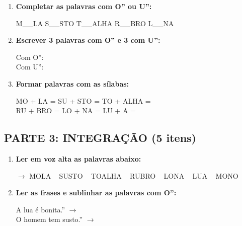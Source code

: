 \begin{exercicio}
\begin{enumerate}[resume]
  \item \textbf{Completar as palavras com O'' ou U'':}
  \begin{center}
  M\underline{~~~}LA \quad S\underline{~~~}STO \quad T\underline{~~~}ALHA \quad R\underline{~~~}BRO \quad L\underline{~~~}NA
  \end{center}

  \item \textbf{Escrever 3 palavras com O'' e 3 com U'':}
  \begin{center}
  Com O'': \underline{\hspace{2.2cm}} \underline{\hspace{2.2cm}} \underline{\hspace{2.2cm}} \\
  Com U'': \underline{\hspace{2.2cm}} \underline{\hspace{2.2cm}} \underline{\hspace{2.2cm}}
  \end{center}

  \item \textbf{Formar palavras com as sílabas:}
  \begin{center}
  MO + LA = \underline{\hspace{2cm}} \quad SU + STO = \underline{\hspace{2cm}} \quad TO + ALHA = \underline{\hspace{2cm}} \\
  RU + BRO = \underline{\hspace{2cm}} \quad LO + NA = \underline{\hspace{2cm}} \quad LU + A = \underline{\hspace{2cm}}
  \end{center}
\end{enumerate}

\subsection*{PARTE 3: INTEGRAÇÃO (5 itens)}

\begin{enumerate}[resume]
  \item \textbf{Ler em voz alta as palavras abaixo:}
  \begin{center}
  $\rightarrow$ MOLA  ~  SUSTO  ~  TOALHA  ~  RUBRO  ~  LONA  ~  LUA  ~  MONO
  \end{center}

  \item \textbf{Ler as frases e sublinhar as palavras com O'':}
  \begin{center}
  A lua é bonita.'' $\rightarrow$ \underline{\hspace{5cm}} \\
  O homem tem susto.'' $\rightarrow$ \underline{\hspace{5cm}}
  \end{center}


\end{enumerate}
\end{exercicio}
